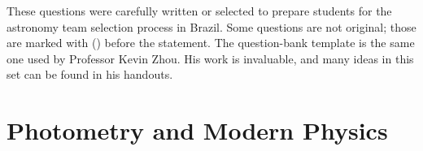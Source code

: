 \documentclass[11pt]{article}
\begin{document}

These questions were carefully written or selected to prepare students for the astronomy team selection process in Brazil. Some questions are not original; those are marked with () before the statement. The question-bank template is the same one used by Professor Kevin Zhou. His work is invaluable, and many ideas in this set can be found in his handouts.




\section{Photometry and Modern Physics}
\end{document}
